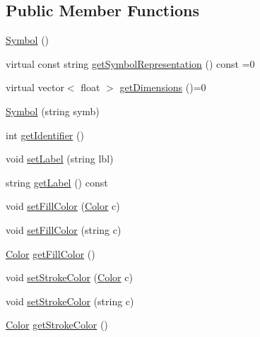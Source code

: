 \subsection*{Public Member Functions}
\begin{DoxyCompactItemize}
\item 
\mbox{\hyperlink{classbridges_1_1datastructure_1_1_symbol_a6169106c021d20752abba3cd266ecfb0}{Symbol}} ()
\item 
virtual const string \mbox{\hyperlink{classbridges_1_1datastructure_1_1_symbol_a8044b3da559dcd9de8510ae339f126c8}{get\+Symbol\+Representation}} () const =0
\item 
virtual vector$<$ float $>$ \mbox{\hyperlink{classbridges_1_1datastructure_1_1_symbol_a37ba60b6acdd0888677eb8c64a931679}{get\+Dimensions}} ()=0
\item 
\mbox{\hyperlink{classbridges_1_1datastructure_1_1_symbol_adaeede160240bcc959d1813c5cb79528}{Symbol}} (string symb)
\item 
int \mbox{\hyperlink{classbridges_1_1datastructure_1_1_symbol_ac4b6cfcf91217d66ed0694080846970f}{get\+Identifier}} ()
\item 
void \mbox{\hyperlink{classbridges_1_1datastructure_1_1_symbol_a34609dd22e5043c39d40524d05e337b0}{set\+Label}} (string lbl)
\item 
string \mbox{\hyperlink{classbridges_1_1datastructure_1_1_symbol_a549906b96da5d53b964844ca5f593b7f}{get\+Label}} () const
\item 
void \mbox{\hyperlink{classbridges_1_1datastructure_1_1_symbol_a3019a17458fe5f0381cfd611338af6f7}{set\+Fill\+Color}} (\mbox{\hyperlink{classbridges_1_1datastructure_1_1_color}{Color}} c)
\item 
void \mbox{\hyperlink{classbridges_1_1datastructure_1_1_symbol_ad7b92720fe76b59f1922fe25c967f442}{set\+Fill\+Color}} (string c)
\item 
\mbox{\hyperlink{classbridges_1_1datastructure_1_1_color}{Color}} \mbox{\hyperlink{classbridges_1_1datastructure_1_1_symbol_a4b29601e24832077a15321af5c71cfdf}{get\+Fill\+Color}} ()
\item 
void \mbox{\hyperlink{classbridges_1_1datastructure_1_1_symbol_ad98bc6de925ff8ee2274298e42617fc8}{set\+Stroke\+Color}} (\mbox{\hyperlink{classbridges_1_1datastructure_1_1_color}{Color}} c)
\item 
void \mbox{\hyperlink{classbridges_1_1datastructure_1_1_symbol_af5f15111c67cfd63d3b0b3dc70442d0c}{set\+Stroke\+Color}} (string c)
\item 
\mbox{\hyperlink{classbridges_1_1datastructure_1_1_color}{Color}} \mbox{\hyperlink{classbridges_1_1datastructure_1_1_symbol_aa99d36f97deaf99bee1d61778c85e87d}{get\+Stroke\+Color}} ()

\end{DoxyCompactItemize}
